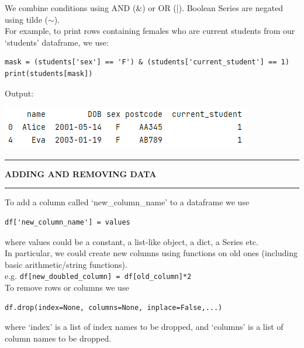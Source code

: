 \documentclass[8pt]{extarticle}
\newcommand{\heading}[1]{%
    \noindent
    \rule{\linewidth}{0.4pt}
    \begin{center}
        \vspace{-1ex}
        \textbf{#1}        
        \vspace{-2.5ex}
    \end{center}
    \rule{\linewidth}{0.4pt}
}
\begin{document}
\begin{multicols}{4}
We combine conditions using AND (\&) or OR (|). Boolean Series are negated using tilde ($\sim$). \\

For example, to print rows containing females who are current students from our `students' dataframe, we use:

\begin{lstlisting}[style=Python]
mask = (students['sex'] == 'F') & (students['current_student'] == 1)
print(students[mask])
\end{lstlisting}
Output:

\begin{center}
\includegraphics[scale = 0.53]{images/filtered_output.png}
\end{center}

\heading{ADDING AND REMOVING DATA}

To add a column called `new\_column\_name' to a dataframe we use 
\begin{lstlisting}[style=Python]
df['new_column_name'] = values
\end{lstlisting}
where values could be a constant, a list-like object, a dict, a Series etc. \\
In particular, we could create new columns using functions on old ones (including basic arithmetic/string functions). \\
e.g. \lstinline[style=Python]!df[new_doubled_column] = df[old_column]*2 !  \\

To remove rows or columns we use 
\begin{lstlisting}[style=Python]
df.drop(index=None, columns=None, inplace=False,...)
\end{lstlisting}
where `index' is a list of index names to be dropped, and `columns' is a list of column names to be dropped.

\end{multicols}
\newpage
\thispagestyle{empty} 
\end{document}
